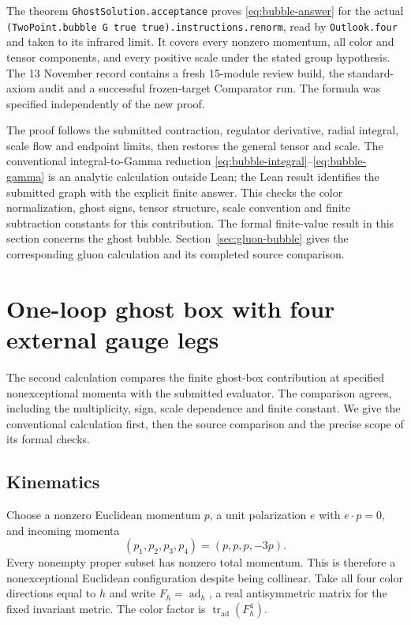 \documentclass[11pt]{article}
\newcommand{\tr}{\operatorname{tr}}
\newcommand{\ad}{\operatorname{ad}}
\newcommand{\code}[1]{{\small\nolinkurl{#1}}}
\begin{document}
The theorem \code{GhostSolution.acceptance} proves
\eqref{eq:bubble-answer} for the actual
\code{(TwoPoint.bubble G true true).instructions.renorm}, read by
\code{Outlook.four} and taken to its infrared limit. It covers every nonzero
momentum, all color and tensor components, and every positive scale under
the stated group hypothesis. The 13 November record contains a fresh
15-module review build, the standard-axiom audit and a successful frozen-target
Comparator run. The formula was specified independently of the new proof.

The proof follows the submitted contraction, regulator derivative, radial
integral, scale flow and endpoint limits, then restores the general tensor
and scale. The conventional integral-to-Gamma reduction
\eqref{eq:bubble-integral}--\eqref{eq:bubble-gamma} is an analytic calculation outside Lean;
the Lean result identifies the submitted graph with the explicit finite
answer. This checks the color normalization, ghost signs, tensor structure,
scale convention and finite subtraction constants for this contribution.
The formal finite-value result in this section concerns the ghost bubble. Section~\ref{sec:gluon-bubble} gives the corresponding gluon calculation and its completed source comparison.

\section{One-loop ghost box with four external gauge legs}
\label{sec:box}

The second calculation compares the finite ghost-box contribution at
specified nonexceptional momenta with the submitted evaluator. The comparison
agrees, including the multiplicity, sign, scale dependence and finite
constant. We give the conventional calculation first, then the source
comparison and the precise scope of its formal checks.

\subsection{Kinematics}

Choose a nonzero Euclidean momentum $p$, a unit polarization $e$ with
$e\cdot p=0$, and incoming momenta
\begin{equation}\label{eq:box-momenta}
 (p_1,p_2,p_3,p_4)=(p,p,p,-3p).
\end{equation}
Every nonempty proper subset has nonzero total momentum. This is therefore
a nonexceptional Euclidean configuration despite being collinear. Take all
four color directions equal to $h$ and write $F_h=\ad_h$, a real
antisymmetric matrix for the fixed invariant metric. The color factor is
$\tr_{\ad}(F_h^4)$.
\end{document}
